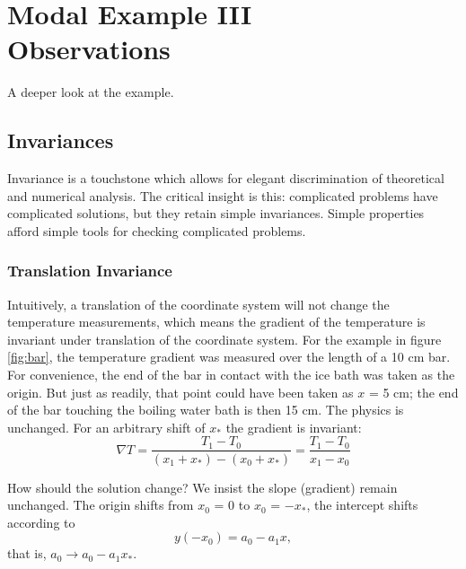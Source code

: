 \chapter[Modal Example III: Observations]{Modal Example III\\Observations}

A deeper look at the example.

\section{Invariances}  %
Invariance is a touchstone which allows for elegant discrimination of theoretical and numerical analysis. The critical insight is this: complicated problems have complicated solutions, but they retain simple invariances. Simple properties afford simple tools for checking complicated problems.

\subsection{Translation Invariance}  %
Intuitively, a translation of the coordinate system will not change the temperature measurements, which means the gradient of the temperature is invariant under translation of the coordinate system. For the example in figure \ref{fig:bar}, the temperature gradient was measured over the length of a 10 cm bar. For convenience, the end of the bar in contact with the ice bath was taken as the origin. But just as readily, that point could have been taken as $x$ = 5 cm; the end of the bar touching the boiling water bath is then 15 cm. The physics is unchanged. For an arbitrary shift of $x_{*}$ the gradient is invariant:
  \begin{equation*}   %
    \nabla T = \frac{T_{1} - T_{0}} { (x_{1} + x_{*}) - (x_{0} + x_{*}) }
             = \frac{T_{1} - T_{0}} { x_{1} - x_{0} }
  \end{equation*}

How should the solution change? We insist the slope (gradient) remain unchanged. The origin shifts from $x_{0}$ = 0 to $x_{0}$ = $-x_{*}$, the intercept shifts according to
  \begin{equation*}   %
      y(-x_{0}) = a_{0} - a_{1} x,
  \end{equation*}
that is, $a_{0} \to a_{0} - a_{1} x_{*}$.

